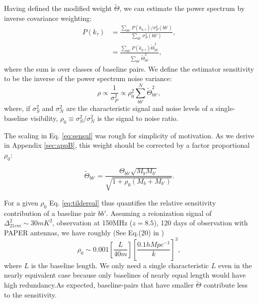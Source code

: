 \documentclass[twocolumn,apj,numberedappendix]{emulateapj}
\renewcommand\[{\begin{equation}}
\renewcommand\]{\end{equation}}
\begin{document}
Having defined the modified weight $\widetilde{\Theta}$, we can estimate the power spectrum by inverse covariance weighting:
\begin{equation}
\begin{aligned}
 P(k_{\tau}) &= \frac{\sum_{bb'}P(k_{b,\tau})/\sigma_P^2(bb')}{\sum_{bb'}\sigma_P^2(bb')}, \\
 &= \frac{\sum_{bb'}P(k_{b,\tau})\widetilde{\Theta}_{bb'}^2}{\sum_{bb'}\widetilde{\Theta}_{bb'}^2},
 \end{aligned}
\end{equation}
where the sum is over classes of baseline pairs. 
We define the estimator sensitivity to be the inverse of the power spectrum noise variance:
\begin{equation}
\rho \propto \frac{1}{\sigma_P^2} \propto \rho_0^2\sum_{bb'}^N\widetilde{\Theta}^2_{bb'},
\end{equation}
where, if $\sigma_S^2$ and $\sigma_N^2$ are the characteristic signal and noise levels of a single-baseline visibility, $\rho_0\equiv\sigma_S^2/\sigma_N^2$ is the signal to noise ratio. 


The scaling in Eq. \eqref{eq:sensul} was rough for simplicity of motivation. As we derive in Appendix \ref{sec:appB}, this weight should be corrected by a factor proportional $\rho_0$:

\begin{equation}
\label{eq:tildereal}
\widetilde{\Theta}_{bb'}=\frac{\Theta_{bb'}\sqrt{M_bM_{b'}}}{\sqrt{1 + \rho_0 \left(M_b+M_{b'} \right)}}.
\end{equation}

For a given $\rho_0$ Eq. \eqref{eq:tildereal} thus quantifies the relative sensitivity contribution of a baseline pair $bb'$. Assuming a reionization signal of $\Delta_{21cm}^2\sim 30mK^2$, observation at 150MHz ($z=8.5$), 120 days of observation with PAPER antennas, we have roughly
(See Eq.(20) in \cite{first-paper})
\begin{equation}
\rho_0 \sim 0.001\left[\frac{L}{40m}\right] \left[\frac{0.1hMpc^{-1}}{k}\right]^3, 
\end{equation}
where $L$ is the baseline length. We only need a single characteristic $L$ even in the nearly equivalent case because only baselines of nearly equal length would have high redundancy.As expected, baseline-pairs that have smaller $\widetilde{\Theta}$ contribute less to the sensitivity. 
\end{document}

